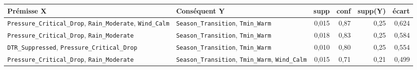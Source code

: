 \footnotesize
\begin{tabular}{>{\raggedright\arraybackslash}p{4.7cm}>{\raggedright\arraybackslash}p{4.4cm}rrrr}
\toprule
\rowcolor{NuitBleue!90}
\color{white}\textbf{Prémisse X} & \color{white}\textbf{Conséquent Y} & \color{white}\textbf{supp} & \color{white}\textbf{conf} & \color{white}\textbf{supp(Y)} & \color{white}\textbf{écart} \\
\midrule
\texttt{Pressure\_Critical\_Drop}, \texttt{Rain\_Moderate}, \texttt{Wind\_Calm} & \texttt{Season\_Transition}, \texttt{Tmin\_Warm} & 0,015 & 0,87 & 0,25 & 0,624 \\
\texttt{Pressure\_Critical\_Drop}, \texttt{Rain\_Moderate} & \texttt{Season\_Transition}, \texttt{Tmin\_Warm} & 0,018 & 0,83 & 0,25 & 0,584 \\
\texttt{DTR\_Suppressed}, \texttt{Pressure\_Critical\_Drop} & \texttt{Season\_Transition}, \texttt{Tmin\_Warm} & 0,010 & 0,80 & 0,25 & 0,554 \\
\texttt{Pressure\_Critical\_Drop}, \texttt{Rain\_Moderate} & \texttt{Season\_Transition}, \texttt{Tmin\_Warm}, \texttt{Wind\_Calm} & 0,015 & 0,71 & 0,21 & 0,499 \\
\bottomrule
\end{tabular}
